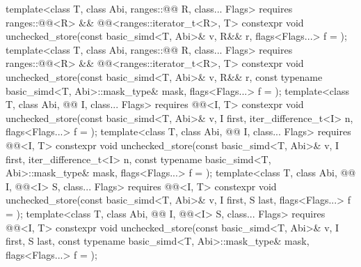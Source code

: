 \begin{itemdecl}
template<class T, class Abi, ranges::@@ R, class... Flags>
  requires ranges::@@<R> && @@<ranges::iterator_t<R>, T>
  constexpr void unchecked_store(const basic_simd<T, Abi>& v, R&& r, flags<Flags...> f = {});
template<class T, class Abi, ranges::@@ R, class... Flags>
  requires ranges::@@<R> && @@<ranges::iterator_t<R>, T>
  constexpr void unchecked_store(const basic_simd<T, Abi>& v, R&& r,
    const typename basic_simd<T, Abi>::mask_type& mask, flags<Flags...> f = {});
template<class T, class Abi, @@ I, class... Flags>
  requires @@<I, T>
  constexpr void unchecked_store(const basic_simd<T, Abi>& v, I first, iter_difference_t<I> n,
                                 flags<Flags...> f = {});
template<class T, class Abi, @@ I, class... Flags>
  requires @@<I, T>
  constexpr void unchecked_store(const basic_simd<T, Abi>& v, I first, iter_difference_t<I> n,
    const typename basic_simd<T, Abi>::mask_type& mask, flags<Flags...> f = {});
template<class T, class Abi, @@ I, @@<I> S, class... Flags>
  requires @@<I, T>
  constexpr void unchecked_store(const basic_simd<T, Abi>& v, I first, S last,
                                 flags<Flags...> f = {});
template<class T, class Abi, @@ I, @@<I> S, class... Flags>
  requires @@<I, T>
  constexpr void unchecked_store(const basic_simd<T, Abi>& v, I first, S last,
    const typename basic_simd<T, Abi>::mask_type& mask, flags<Flags...> f = {});
\end{itemdecl}

